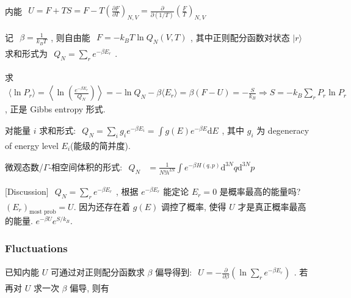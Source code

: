 \documentclass[../../main.tex]{subfiles}
\begin{document}
内能 $\begin{aligned}
    U = F + TS = F - T\left(\frac{\partial F}{\partial T}\right)_{N,V} = \frac{\partial}{\partial (1/T)}\left(\frac{F}{T}\right)_{N,V}
\end{aligned}$

记 $\begin{aligned}
    \beta = \frac{1}{k_{B}T}
\end{aligned}$, 则自由能 $\begin{aligned}
    F = -k_{B}T\ln{Q_{N}(V,T)}
\end{aligned}$, 其中正则配分函数对状态 $|r\rangle$ 求和形式为 $\begin{aligned}
    Q_{N} = \sum_{r}e^{-\beta E_{r}}
\end{aligned}$. 

求 $\begin{aligned}
    \langle \ln{P_{r}}\rangle =\left\langle \ln{\left(\frac{e^{-\beta E_{r}}}{Q_{N}}\right)}\right\rangle = -\ln{Q_{N}} - \beta\langle E_{r}\rangle = \beta(F-U) = -\frac{S}{k_{B}}
    \Rightarrow S = -k_{B}\sum_{r}P_{r}\ln{P_{r}}
\end{aligned}$, 正是 Gibbs entropy 形式. 

对能量 $i$ 求和形式: $\begin{aligned}
    Q_{N} = \sum_{i}g_{i}e^{-\beta E_{i}} = \int g(E)e^{-\beta E}\mathrm{d}E
\end{aligned}$, 其中 $g_{i}$ 为 degeneracy of energy level $E_{i}$(能级的简并度).

微观态数/$\Gamma$-相空间体积的形式: $\begin{aligned}
    Q_{N} &= \frac{1}{N!h^{3N}}\int e^{-\beta H(q,p)}\mathrm{d}^{3N}q\mathrm{d}^{3N}p
\end{aligned}$

[Discussion] $\begin{aligned}
    Q_{N} = \sum_{r}e^{-\beta E_{r}}
\end{aligned}$, 根据 $e^{-\beta E_{r}}$ 能定论 $E_{r}=0$ 是概率最高的能量吗? $(E_{r})_{\text{most prob}} = U$. 因为还存在着 $g(E)$ 调控了概率, 使得 $U$ 才是真正概率最高的能量. $e^{-\beta U}e^{S/k_{B}}$.

\subsubsection{Fluctuations}
已知内能 $U$ 可通过对正则配分函数求 $\beta$ 偏导得到: $\begin{aligned}
    U = -\frac{\partial}{\partial\beta}\left(\ln\sum_{r}e^{-\beta E_{r}}\right)
\end{aligned}$. 若再对 $U$ 求一次 $\beta$ 偏导, 则有
\end{document}
